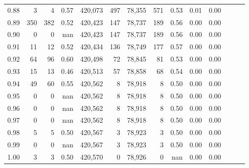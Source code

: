 \begin{tabular}{rrrrrrrrrrrrrr}
0.88 &       3 &      4 &  0.57 &  420,073 &      497 &  78,355 &     571 &  0.53 &  0.01 &      0.00 \\
0.89 &     350 &    382 &  0.52 &  420,423 &      147 &  78,737 &     189 &  0.56 &  0.00 &      0.00 \\
0.90 &       0 &      0 &   nan &  420,423 &      147 &  78,737 &     189 &  0.56 &  0.00 &      0.00 \\
0.91 &      11 &     12 &  0.52 &  420,434 &      136 &  78,749 &     177 &  0.57 &  0.00 &      0.00 \\
0.92 &      64 &     96 &  0.60 &  420,498 &       72 &  78,845 &      81 &  0.53 &  0.00 &      0.00 \\
0.93 &      15 &     13 &  0.46 &  420,513 &       57 &  78,858 &      68 &  0.54 &  0.00 &      0.00 \\
0.94 &      49 &     60 &  0.55 &  420,562 &        8 &  78,918 &       8 &  0.50 &  0.00 &      0.00 \\
0.95 &       0 &      0 &   nan &  420,562 &        8 &  78,918 &       8 &  0.50 &  0.00 &      0.00 \\
0.96 &       0 &      0 &   nan &  420,562 &        8 &  78,918 &       8 &  0.50 &  0.00 &      0.00 \\
0.97 &       0 &      0 &   nan &  420,562 &        8 &  78,918 &       8 &  0.50 &  0.00 &      0.00 \\
0.98 &       5 &      5 &  0.50 &  420,567 &        3 &  78,923 &       3 &  0.50 &  0.00 &      0.00 \\
0.99 &       0 &      0 &   nan &  420,567 &        3 &  78,923 &       3 &  0.50 &  0.00 &      0.00 \\
1.00 &       3 &      3 &  0.50 &  420,570 &        0 &  78,926 &       0 &   nan &  0.00 &      0.00 \\
\bottomrule
\end{tabular}
